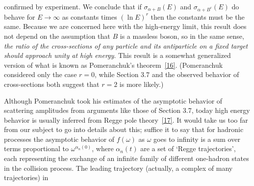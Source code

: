 confirmed by experiment. We conclude that if $\sigma_{\alpha+B}(E)$ and
$\sigma_{\alpha+B^c}(E)$ do behave for $E\to\infty$ as constants times
$(\ln E)^r$ then the constants must be the same. Because we are concerned
here with the high-energy limit, this result does not depend on the assumption
that $B$ is a massless boson, so in the same sense, \emph{the ratio of the
cross-sections of any particle and its antiparticle on a fixed target should
approach unity at high energy}. This result is a somewhat generalized version
of what is known as Pomeranchuk's theorem~\hyperref[ref:10.16]{[16]}.
(Pomeranchuk considered only the case $r=0$, while Section 3.7 and the
observed behavior of cross-sections both suggest that $r=2$ is more likely.)

Although Pomeranchuk took his estimates of the asymptotic behavior of
scattering amplitudes from arguments like those of Section 3.7, today high
energy behavior is usually inferred from Regge pole theory~\hyperref[ref:10.17]{[17]}.
It would take us too far from our subject to go into details about this;
suffice it to say that for hadronic processes the asymptotic behavior of
$f(\omega)$ as $\omega$ goes to infinity is a sum over terms proportional to
$\omega^{\alpha_n(0)}$, where $\alpha_n(t)$ are a set of `Regge trajectories',
each representing the exchange of an infinite family of different one-hadron
states in the collision process. The leading trajectory (actually, a complex
of many trajectories) in
